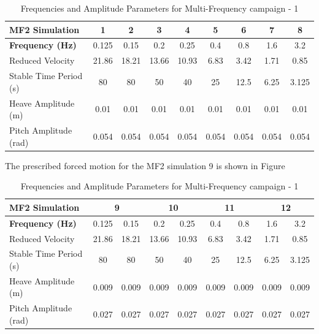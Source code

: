 \documentclass[a4paper, 12pt]{report}
\begin{document}
\begin{table}[htbp]
\centering
\renewcommand{\arraystretch}{1.2}
\caption{Frequencies and Amplitude Parameters for Multi-Frequency campaign - 1}
\label{tab:Frequencies and Amplitude Parameters for Multi-Frequency campaign - 1}
\begin{tabular}{|l|c|c|c|c|c|c|c|c|}
\hline
\rule{0pt}{12pt}\textbf{MF2 Simulation} & 1 & 2 & 3 & 4 & 5 & 6 & 7 & 8 \\[4pt]
\hline
\rule{0pt}{12pt}\textbf{Frequency (Hz)} & 0.125 & 0.15 & 0.2 & 0.25 & 0.4 & 0.8 & 1.6 & 3.2 \\[4pt]
\hline
Reduced Velocity        & 21.86 & 18.21 & 13.66 & 10.93 & 6.83 & 3.42 & 1.71 & 0.85 \\
Stable Time Period (s)  & 80    & 80    & 50    & 40    & 25   & 12.5 & 6.25 & 3.125 \\
Heave Amplitude (m)     & 0.01 & 0.01 & 0.01 & 0.01 & 0.01 & 0.01 & 0.01 & 0.01 \\
Pitch Amplitude (rad)   & 0.054 & 0.054 & 0.054 & 0.054 & 0.054 & 0.054 & 0.054 & 0.054 \\
\hline
\end{tabular}
\end{table}

The prescribed forced motion for the MF2 simulation 9 is shown in Figure


\begin{table}[htbp]
\centering
\renewcommand{\arraystretch}{1.2}
\caption{Frequencies and Amplitude Parameters for Multi-Frequency campaign - 1}
\label{tab:Frequencies and Amplitude Parameters for Multi-Frequency campaign - 1}
\begin{tabular}{|l|cc|cc|cc|cc|}
\hline
\rule{0pt}{12pt}\textbf{MF2 Simulation} & \multicolumn{2}{c|}{9} & \multicolumn{2}{c|}{10} & \multicolumn{2}{c|}{11} & \multicolumn{2}{c|}{12} \\[4pt]
\hline
\rule{0pt}{12pt}\textbf{Frequency (Hz)} & 0.125 & 0.15 & 0.2 & 0.25 & 0.4 & 0.8 & 1.6 & 3.2 \\[4pt]
\hline
Reduced Velocity        & 21.86 & 18.21 & 13.66 & 10.93 & 6.83 & 3.42 & 1.71 & 0.85 \\
Stable Time Period (s)  & 80    & 80    & 50    & 40    & 25   & 12.5 & 6.25 & 3.125 \\
Heave Amplitude (m)     & 0.009 & 0.009 & 0.009 & 0.009 & 0.009 & 0.009 & 0.009 & 0.009 \\
Pitch Amplitude (rad)   & 0.027 & 0.027 & 0.027 & 0.027 & 0.027 & 0.027 & 0.027 & 0.027 \\
\hline
\end{tabular}
\end{table}
\end{document}
